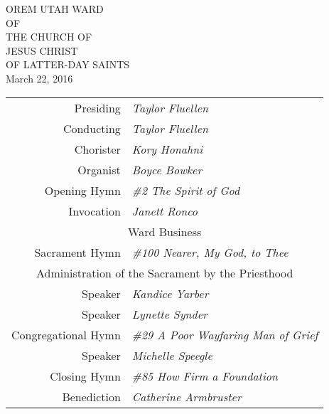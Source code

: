 \documentclass[11pt,twocolumn]{memoir}
\renewcommand\&{{\textnormal{\fontspec{Minion Pro}\itshape\amp}}}
\begin{document}
\begin{center}
    {\large\MakeUppercase{Orem Utah Ward}}\\
    {\tiny\MakeUppercase{of}}\\
    {\smalllogo\MakeUppercase{The Church of}}\\\vspace{0.4em}
    {\largelogo\MakeUppercase{Jesus Christ}}\\
    {\smalllogo\MakeUppercase{of Latter-day Saints}}\\\vspace{2em}
    {\huge{March 22, 2016}}\\\vspace{2em}
    \begin{tabular}{r @{\space\space\textperiodcentered\space\space} >{\itshape}l}
        Presiding & Taylor Fluellen\\
        Conducting & Taylor Fluellen\\
        Chorister & Kory Honahni\\
        Organist & Boyce Bowker\vspace{4em}\\

        Opening Hymn & \#2 The Spirit of God\\
        Invocation & Janett Ronco\vspace{1em}\\

        \multicolumn{2}{c}{Ward Business}\vspace{1em}\\

        Sacrament Hymn & \#100 Nearer, My God, to Thee\vspace{1em}\\

        \multicolumn{2}{c}{Administration of the Sacrament by the Priesthood}\vspace{1em}\\

        Speaker & Kandice Yarber\\
        Speaker & Lynette Synder\vspace{1em}\\
        Congregational Hymn & \#29 A Poor Wayfaring Man of Grief\vspace{1em}\\
        Speaker & Michelle Speegle\vspace{1em}\\
        Closing Hymn & \#85 How Firm a Foundation\\
        Benediction & Catherine Armbruster
    \end{tabular}
\end{center}
\end{document}
